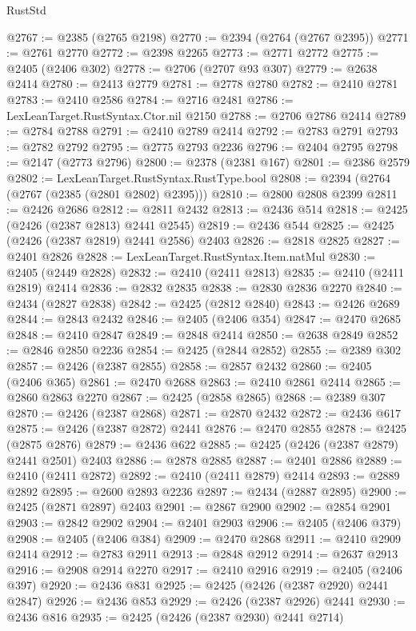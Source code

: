 \begin{lexlean}{RustStd}
\begin{coremodule}
@2767 := @2385 (@2765 @2198)
@2770 := @2394 (@2764 (@2767 @2395))
@2771 := @2761 @2770
@2772 := @2398 @2265
@2773 := @2771 @2772
@2775 := @2405 (@2406 @302)
@2778 := @2706 (@2707 @93 @307)
@2779 := @2638 @2414
@2780 := @2413 @2779
@2781 := @2778 @2780
@2782 := @2410 @2781
@2783 := @2410 @2586
@2784 := @2716 @2481
@2786 := LexLeanTarget.RustSyntax.Ctor.nil @2150
@2788 := @2706 @2786 @2414
@2789 := @2784 @2788
@2791 := @2410 @2789 @2414
@2792 := @2783 @2791
@2793 := @2782 @2792
@2795 := @2775 @2793 @2236
@2796 := @2404 @2795
@2798 := @2147 (@2773 @2796)
@2800 := @2378 (@2381 @167)
@2801 := @2386 @2579
@2802 := LexLeanTarget.RustSyntax.RustType.bool
@2808 := @2394 (@2764 (@2767 (@2385 (@2801 @2802) @2395)))
@2810 := @2800 @2808 @2399
@2811 := @2426 @2686
@2812 := @2811 @2432
@2813 := @2436 @514
@2818 := @2425 (@2426 (@2387 @2813) @2441 @2545)
@2819 := @2436 @544
@2825 := @2425 (@2426 (@2387 @2819) @2441 @2586) @2403
@2826 := @2818 @2825
@2827 := @2401 @2826
@2828 := LexLeanTarget.RustSyntax.Item.natMul
@2830 := @2405 (@2449 @2828)
@2832 := @2410 (@2411 @2813)
@2835 := @2410 (@2411 @2819) @2414
@2836 := @2832 @2835
@2838 := @2830 @2836 @2270
@2840 := @2434 (@2827 @2838)
@2842 := @2425 (@2812 @2840)
@2843 := @2426 @2689
@2844 := @2843 @2432
@2846 := @2405 (@2406 @354)
@2847 := @2470 @2685
@2848 := @2410 @2847
@2849 := @2848 @2414
@2850 := @2638 @2849
@2852 := @2846 @2850 @2236
@2854 := @2425 (@2844 @2852)
@2855 := @2389 @302
@2857 := @2426 (@2387 @2855)
@2858 := @2857 @2432
@2860 := @2405 (@2406 @365)
@2861 := @2470 @2688
@2863 := @2410 @2861 @2414
@2865 := @2860 @2863 @2270
@2867 := @2425 (@2858 @2865)
@2868 := @2389 @307
@2870 := @2426 (@2387 @2868)
@2871 := @2870 @2432
@2872 := @2436 @617
@2875 := @2426 (@2387 @2872) @2441
@2876 := @2470 @2855
@2878 := @2425 (@2875 @2876)
@2879 := @2436 @622
@2885 := @2425 (@2426 (@2387 @2879) @2441 @2501) @2403
@2886 := @2878 @2885
@2887 := @2401 @2886
@2889 := @2410 (@2411 @2872)
@2892 := @2410 (@2411 @2879) @2414
@2893 := @2889 @2892
@2895 := @2600 @2893 @2236
@2897 := @2434 (@2887 @2895)
@2900 := @2425 (@2871 @2897) @2403
@2901 := @2867 @2900
@2902 := @2854 @2901
@2903 := @2842 @2902
@2904 := @2401 @2903
@2906 := @2405 (@2406 @379)
@2908 := @2405 (@2406 @384)
@2909 := @2470 @2868
@2911 := @2410 @2909 @2414
@2912 := @2783 @2911
@2913 := @2848 @2912
@2914 := @2637 @2913
@2916 := @2908 @2914 @2270
@2917 := @2410 @2916
@2919 := @2405 (@2406 @397)
@2920 := @2436 @831
@2925 := @2425 (@2426 (@2387 @2920) @2441 @2847)
@2926 := @2436 @853
@2929 := @2426 (@2387 @2926) @2441
@2930 := @2436 @816
@2935 := @2425 (@2426 (@2387 @2930) @2441 @2714)

\end{coremodule}
\end{lexlean}
